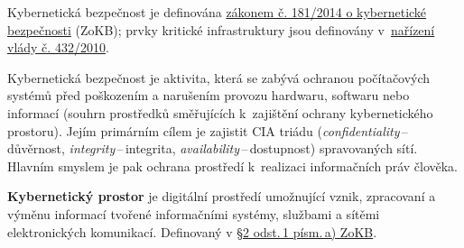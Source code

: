
Kybernetická bezpečnost je definována \href{https://www.zakonyprolidi.cz/cs/2014-181}{zákonem č. 181/2014 o kybernetické bezpečnosti} (ZoKB); prvky kritické infrastruktury jsou definovány v~\href{https://www.zakonyprolidi.cz/cs/2010-432}{nařízení vlády č. 432/2010}.

Kybernetická bezpečnost je aktivita, která se zabývá ochranou počítačových systémů před poškozením a narušením provozu hardwaru, softwaru nebo informací (souhrn prostředků směřujících k~zajištění ochrany kybernetického prostoru). Jejím primárním cílem je zajistit CIA triádu (\emph{confidentiality}\,--\,důvěrnost, \emph{integrity}\,--\,integrita, \emph{availability}\,--\,dostupnost) spravovaných sítí. Hlavním smyslem je pak ochrana prostředí k~realizaci informačních práv člověka.

\textbf{Kybernetický prostor} je digitální prostředí umožnující vznik, zpracovaní a výměnu informací tvořené informačními systémy, službami a sítěmi elektronických komunikací. Definovaný v  \href{https://www.zakonyprolidi.cz/cs/2014-181#p2-1-a}{§2 odst.\,1 písm.\,a) ZoKB}.

